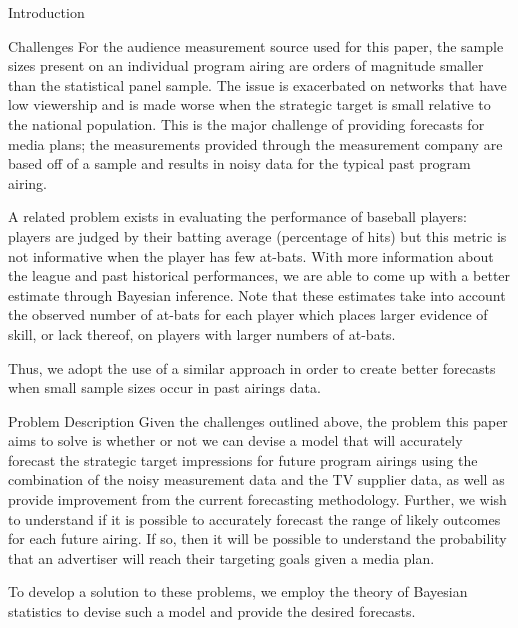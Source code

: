 \begin{chapter}{Introduction}
\begin{section}{Challenges}
  For the audience measurement source used for this paper, the sample sizes
  present on an individual program airing are orders of magnitude smaller than the statistical panel sample.
  The issue is exacerbated on networks that have low viewership and is made worse when
  the strategic target is small relative to the national population.
  This is the major challenge of providing forecasts for media plans;
  the measurements provided through the measurement company are based off of a sample
  and results in noisy data for the typical past program airing.

  A related problem exists in evaluating the performance of baseball players:
  players are judged by their batting average (percentage of hits) but this metric is not informative when
  the player has few at-bats. With more information about the league and past historical performances,
  we are able to come up with a better estimate through Bayesian inference. Note that these estimates
  take into account the observed number of at-bats for each player
  which places larger evidence of skill, or lack thereof, on players with larger numbers of at-bats.

  Thus, we adopt the use of a similar approach in order to create better forecasts when
  small sample sizes occur in past airings data.
\end{section}

\begin{section}{Problem Description}
  Given the challenges outlined above, the problem this paper aims to solve is whether or not
  we can devise a model that will accurately
  forecast the strategic target impressions for future program airings using the combination of the
  noisy measurement data and the TV supplier data, as well as provide improvement from the current forecasting methodology.
  Further, we wish to understand if it is possible to accurately forecast the range of likely
  outcomes for each future airing. If so, then it will be possible to understand the
  probability that an advertiser will reach their targeting goals given a media plan.

  To develop a solution to these problems, we employ the theory of Bayesian statistics to devise such a model
  and provide the desired forecasts.
\end{section}
\end{chapter}